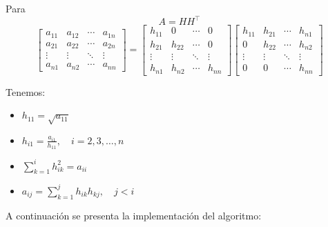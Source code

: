 Para
\[ A = HH^\top \]
\[
\begin{bmatrix}
a_{11} & a_{12} & \cdots & a_{1n} \\
a_{21} & a_{22} & \cdots & a_{2n} \\
\vdots & \vdots & \ddots & \vdots \\
a_{n1} & a_{n2} & \cdots & a_{nn}
\end{bmatrix}
=
\begin{bmatrix}
h_{11} & 0 & \cdots & 0 \\
h_{21} & h_{22} & \cdots & 0 \\
\vdots & \vdots & \ddots & \vdots \\
h_{n1} & h_{n2} & \cdots & h_{nn}
\end{bmatrix}
\begin{bmatrix}
h_{11} & h_{21} & \cdots & h_{n1} \\
0 & h_{22} & \cdots & h_{n2} \\
\vdots & \vdots & \ddots & \vdots \\
0 & 0 & \cdots & h_{nn}
\end{bmatrix}
\]

Tenemos:
\begin{itemize}
    \item $h_{11} = \sqrt{a_{11}}$
    \item $h_{i1} = \frac{a_{i1}}{h_{11}}, \quad i = 2, 3, \dots, n$
    \item $\sum_{k=1}^{i} h_{ik}^2 = a_{ii}$
    \item $a_{ij} = \sum_{k=1}^{j} h_{ik}h_{kj}, \quad j < i$
\end{itemize}
\begin{algorithm}[H]
\DontPrintSemicolon
{}


\BlankLine
{}

\caption{Algoritmo de Factorización de Cholesky}
\end{algorithm}

A continuación se presenta la implementación del algoritmo:



